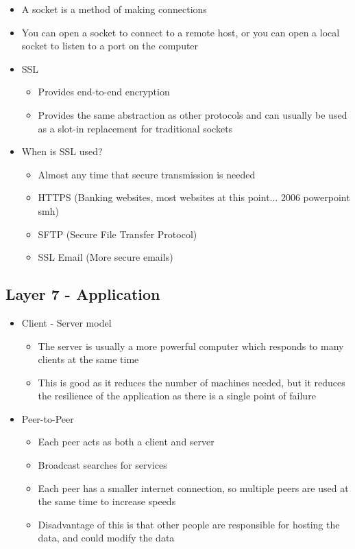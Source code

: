 \begin{itemize}
  \item A socket is a method of making connections
  \item You can open a socket to connect to a remote host, or you can open a local socket to listen to a port on the computer
  \item SSL
  \begin{itemize}
    \item Provides end-to-end encryption
    \item Provides the same abstraction as other protocols and can usually be used as a slot-in replacement for traditional sockets
  \end{itemize}
  \item When is SSL used?
  \begin{itemize}
    \item Almost any time that secure transmission is needed
    \item HTTPS (Banking websites, most websites at this point... 2006 powerpoint smh)
    \item SFTP (Secure File Transfer Protocol)
    \item SSL Email (More secure emails)
  \end{itemize}
\end{itemize}

\subsection*{Layer 7 - Application}

\begin{itemize}
  \item Client - Server model
  \begin{itemize}
    \item The server is usually a more powerful computer which responds to many clients at the same time
    \item This is good as it reduces the number of machines needed, but it reduces the resilience of the application as there is a single point of failure
  \end{itemize}
  \item Peer-to-Peer
  \begin{itemize}
    \item Each peer acts as both a client and server
    \item Broadcast searches for services
    \item Each peer has a smaller internet connection, so multiple peers are used at the same time to increase speeds
    \item Disadvantage of this is that other people are responsible for hosting the data, and could modify the data
  \end{itemize}
\end{itemize}

